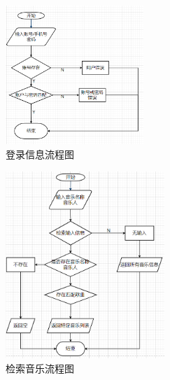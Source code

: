 \documentclass[UTF8,14pt]{article}
\numberwithin{figure}{subsubsection}
\numberwithin{table}{subsubsection}
\begin{document}
\begin{minipage}[t]{0.5\linewidth}
	\centering
	\begin{figure}[H]
		\includegraphics[width=5.224cm,height=5.248cm]{figures/白盒2.png}
		\caption{登录信息流程图}
	\end{figure}

	\begin{figure}[H]
		\includegraphics[width=6.01cm,height=7.08cm]{figures/白盒3.png}
		\caption{检索音乐流程图}
	\end{figure}
\end{minipage}
\end{document}

